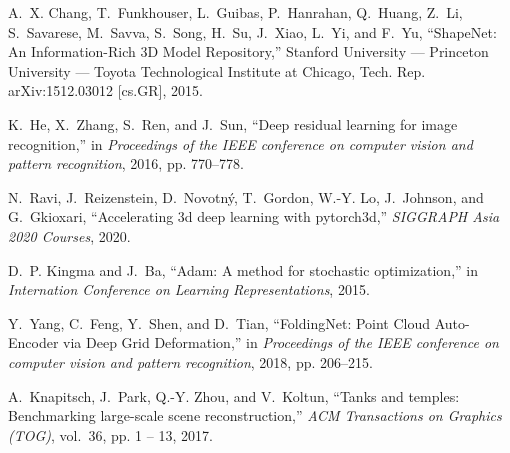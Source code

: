 \documentclass{article}
\begin{document}
\begin{thebibliography}{10}
A.~X. Chang, T.~Funkhouser, L.~Guibas, P.~Hanrahan, Q.~Huang, Z.~Li,
  S.~Savarese, M.~Savva, S.~Song, H.~Su, J.~Xiao, L.~Yi, and F.~Yu,
  ``{ShapeNet: An Information-Rich 3D Model Repository},'' Stanford University
  --- Princeton University --- Toyota Technological Institute at Chicago, Tech.
  Rep. arXiv:1512.03012 [cs.GR], 2015.

K.~He, X.~Zhang, S.~Ren, and J.~Sun, ``Deep residual learning for image
  recognition,'' in \emph{Proceedings of the IEEE conference on computer vision
  and pattern recognition}, 2016, pp. 770--778.

N.~Ravi, J.~Reizenstein, D.~Novotn{\'y}, T.~Gordon, W.-Y. Lo, J.~Johnson, and
  G.~Gkioxari, ``Accelerating 3d deep learning with pytorch3d,'' \emph{SIGGRAPH
  Asia 2020 Courses}, 2020.

D.~P. Kingma and J.~Ba, ``Adam: A method for stochastic optimization,'' in
  \emph{Internation Conference on Learning Representations}, 2015.

Y.~Yang, C.~Feng, Y.~Shen, and D.~Tian, ``{FoldingNet: Point Cloud Auto-Encoder
  via Deep Grid Deformation},'' in \emph{Proceedings of the IEEE conference on
  computer vision and pattern recognition}, 2018, pp. 206--215.

A.~Knapitsch, J.~Park, Q.-Y. Zhou, and V.~Koltun, ``Tanks and temples:
  Benchmarking large-scale scene reconstruction,'' \emph{ACM Transactions on
  Graphics (TOG)}, vol.~36, pp. 1 -- 13, 2017.

\end{thebibliography}
\end{document}
